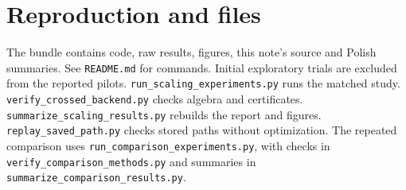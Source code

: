 \documentclass[11pt,a4paper]{article}
\theoremstyle{remark}\newtheorem{remark}[theorem]{Remark}
\begin{document}
\section*{Reproduction and files}
The bundle contains code, raw results, figures, this note's source and Polish
summaries. See \texttt{README.md} for commands. Initial exploratory trials are
excluded from the reported pilots.
\nolinkurl{run_scaling_experiments.py} runs the matched study.
\nolinkurl{verify_crossed_backend.py} checks algebra and certificates.
\nolinkurl{summarize_scaling_results.py} rebuilds the report and figures.
\nolinkurl{replay_saved_path.py} checks stored paths without optimization.
The repeated comparison uses \nolinkurl{run_comparison_experiments.py}, with
checks in \nolinkurl{verify_comparison_methods.py} and summaries in
\nolinkurl{summarize_comparison_results.py}.
\end{document}
